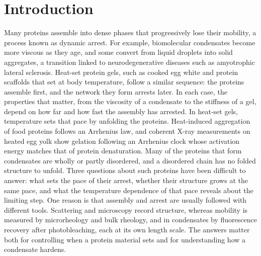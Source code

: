 \documentclass[journal=nalefd,manuscript=letter,layout=traditional]{achemso}
\begin{document}
\section*{Introduction}
Many proteins assemble into dense phases that progressively lose their mobility, a process known as dynamic arrest. For example, biomolecular condensates become more viscous as they age,\cite{Jawerth2020-science} and some convert from liquid droplets into solid aggregates, a transition linked to neurodegenerative diseases such as amyotrophic lateral sclerosis.\cite{Patel2015-cell,Alberti2021-nrmcb} Heat-set protein gels,\cite{Mezzenga2013-rpp} such as cooked egg white\cite{Begam2021-fh,Timmermann2023-sr} and protein scaffolds that set at body temperature,\cite{Roberts2018-yh} follow a similar sequence: the proteins assemble first, and the network they form arrests later. In each case, the properties that matter, from the viscosity of a condensate to the stiffness of a gel, depend on how far and how fast the assembly has arrested. In heat-set gels, temperature sets that pace by unfolding the proteins. Heat-induced aggregation of food proteins follows an Arrhenius law,\cite{Mezzenga2013-rpp} and coherent X-ray measurements on heated egg yolk show gelation following an Arrhenius clock whose activation energy matches that of protein denaturation.\cite{Anthuparambil2023-nc} Many of the proteins that form condensates are wholly or partly disordered,\cite{Banani2017-bb} and a disordered chain has no folded structure to unfold. Three questions about such proteins have been difficult to answer: what sets the pace of their arrest, whether their structure grows at the same pace, and what the temperature dependence of that pace reveals about the limiting step. One reason is that assembly and arrest are usually followed with different tools. Scattering and microscopy record structure, whereas mobility is measured by microrheology and bulk rheology, and in condensates by fluorescence recovery after photobleaching, each at its own length scale.\cite{Alberti2019-bp} The answers matter both for controlling when a protein material sets and for understanding how a condensate hardens.
\end{document}
